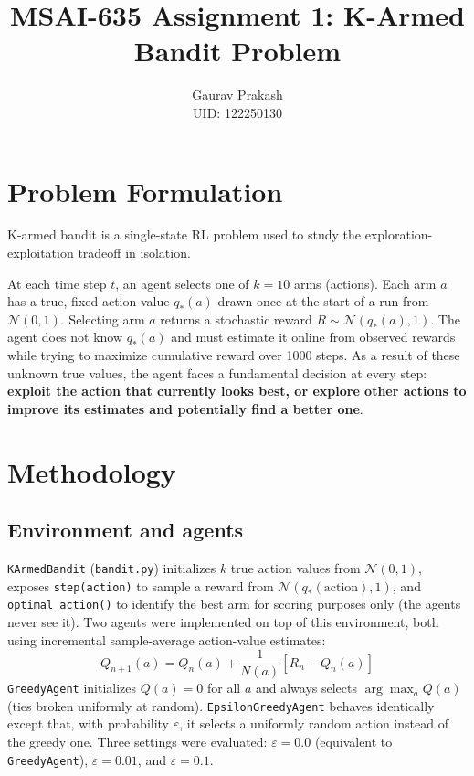 \documentclass[11pt]{article}
\title{\Large\bfseries MSAI-635 Assignment 1: K-Armed Bandit Problem}
\author{Gaurav Prakash \\ UID: 122250130}
\date{}
\begin{document}
\maketitle

\section{Problem Formulation}
K-armed bandit is a single-state RL problem used to study the
exploration-exploitation tradeoff in isolation. 


At each time step $t$, an agent selects one of $k = 10$ arms (actions). Each arm $a$ has a true, fixed action value $q_*(a)$ drawn once at the start of a run from $\mathcal{N}(0, 1)$. Selecting arm $a$ returns a stochastic reward $R \sim \mathcal{N}(q_*(a), 1)$. The agent does not know $q_*(a)$ and must estimate it online from observed rewards while trying to maximize cumulative reward over 1000 steps. As a result of these unknown true values, the agent faces a fundamental decision at every step: \textbf{exploit the action that currently looks best, or explore other actions to improve
its estimates and potentially find a better one}. 



\section{Methodology}

\subsection{Environment and agents}
\texttt{KArmedBandit} (\texttt{bandit.py}) initializes $k$ true action values from
$\mathcal{N}(0, 1)$, exposes \texttt{step(action)} to sample a reward from
$\mathcal{N}(q_*(\text{action}), 1)$, and \texttt{optimal\_action()} to identify the best arm
for scoring purposes only (the agents never see it). Two agents were implemented on top of
this environment, both using incremental sample-average action-value estimates:
\[
Q_{n+1}(a) = Q_n(a) + \frac{1}{N(a)} \left[ R_n - Q_n(a) \right]
\]
\texttt{GreedyAgent} initializes $Q(a) = 0$ for all $a$ and always selects
$\arg\max_a Q(a)$ (ties broken uniformly at random). \texttt{EpsilonGreedyAgent} behaves
identically except that, with probability $\varepsilon$, it selects a uniformly random action
instead of the greedy one. Three settings were evaluated: $\varepsilon = 0.0$ (equivalent to
\texttt{GreedyAgent}), $\varepsilon = 0.01$, and $\varepsilon = 0.1$.
\end{document}
